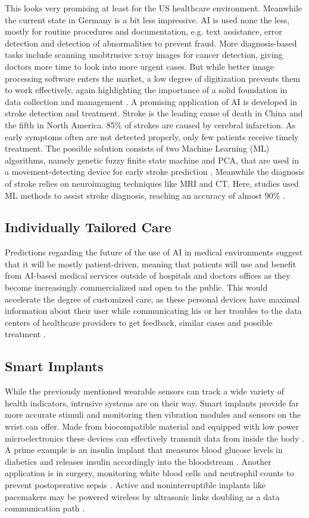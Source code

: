 This looks very promising at least for the US healthcare environment. Meanwhile the current state in Germany is a bit less impressive. AI is used none the less, mostly for routine procedures and documentation, e.g. text assistance, error detection and detection of abnormalities to prevent fraud. More diagnosis-based tasks include scanning unobtrusive x-ray images for cancer detection, giving doctors more time to look into more urgent cases. But while better image processing software enters the market, a low degree of digitization prevents them to work effectively, again highlighting the importance of a solid foundation in data collection and management \cite{kiKroenung}. A promising application of AI is developed in stroke detection and treatment. Stroke is the leading cause of death in China and the fifth in North America. 85\% of strokes are caused by cerebral infarction. As early symptoms often are not detected properly, only few patients receive timely treatment. The possible solution consists of two Machine Learning (ML) algorithms, namely genetic fuzzy finite state machine and PCA, that are used in a movement-detecting device for early stroke prediction \cite{villar2015improving}. Meanwhile the diagnosis of stroke relies on neuroimaging techniques like MRI and CT. Here, studies used ML methods to assist stroke diagnosis, reaching an accuracy of almost 90\% \cite{rehme2014identifying}.
\subsection{Individually Tailored Care}
Predictions regarding the future of the use of AI in medical environments suggest that it will be mostly patient-driven, meaning that patients will use and benefit from AI-based medical services outside of hospitals and doctors offices as they become increasingly commercialized and open to the public. This would accelerate the degree of customized care, as these personal devices have maximal information about their user while communicating his or her troubles to the data centers of healthcare providers to get feedback, similar cases and possible treatment \cite{kiKroenung}.
\subsection{Smart Implants}
While the previously mentioned wearable sensors can track a wide variety of health indicators, intrusive systems are on their way. Smart implants provide far more accurate stimuli and monitoring then vibration modules and sensors on the wrist can offer. Made from biocompatible material and equipped with low power microelectronics these devices can effectively transmit data from inside the body \cite{andreu2015wearable}. A prime example is an insulin implant that measures blood glucose levels in diabetics and releases insulin accordingly into the bloodstream \cite{rege2017development}. Another application is in surgery, monitoring white blood cells and neutrophil counts to prevent postoperative sepsis \cite{venema2013robustness}. Active and noninterruptible implants like pacemakers may be powered wireless by ultrasonic links doubling as a data communication path \cite{ozeri2010ultrasonic}.
